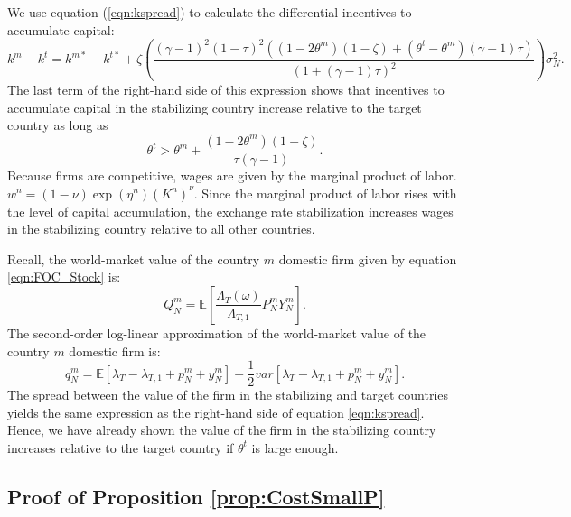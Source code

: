 We use equation (\ref{eqn:kspread}) to calculate the differential
incentives to accumulate capital:
\begin{equation*}
  k^m - k^t = k^{m \ast} - k^{t \ast} + \zeta 
  \left( \frac{(\gamma - 1)^2 (1 - \tau)^2\left( (1 - 2 \theta^m)(1 - \zeta) + (\theta^t - \theta^m)(\gamma - 1) \tau \right)}{\left( 1 + (\gamma - 1) \tau \right)^2 } \right) \sigma_N^2.
\end{equation*}
The last term of the right-hand side of this expression shows that
incentives to accumulate capital in the stabilizing country increase
relative to the target country as long as
\begin{equation*}
  \theta^t > \theta^m + \frac{(1 - 2 \theta^m)(1 - \zeta)}{\tau (\gamma - 1)}. 
\end{equation*}
Because firms are competitive, wages are given by the marginal product
of labor.
$w^n = (1 - \nu) \exp\left( \eta^n \right) \left(K^n\right)^\nu $.
Since the marginal product of labor rises with the level of capital
accumulation, the exchange rate stabilization increases wages in the
stabilizing country relative to all other countries.

Recall, the world-market value of the country $m$ domestic firm given
by equation \eqref{eqn:FOC_Stock} is:
\begin{equation*}
  Q^m_N = \mathbb{E}\left[
    \frac{\Lambda_T(\omega)}{\Lambda_{T, 1}} P^m_N Y^m_N
  \right].
\end{equation*}
The second-order log-linear approximation of the world-market value of
the country $m$ domestic firm is:
\begin{equation*}
  q^m_N 
  = \mathbb{E} \left[ \lambda_T - \lambda_{T, 1} + p^m_N + y^m_N \right] 
  + \frac{1}{2} var\left[ \lambda_T - \lambda_{T, 1} + p^m_N + y^m_N \right].
\end{equation*}
The spread between the value of the firm in the stabilizing and target
countries yields the same expression as the right-hand side of
equation \eqref{eqn:kspread}. Hence, we have already shown the value
of the firm in the stabilizing country increases relative to the
target country if $\theta^t$ is large enough.


\subsection{Proof of Proposition
  \ref{prop:CostSmallP} \label{Appendix_CostSmallP}}

